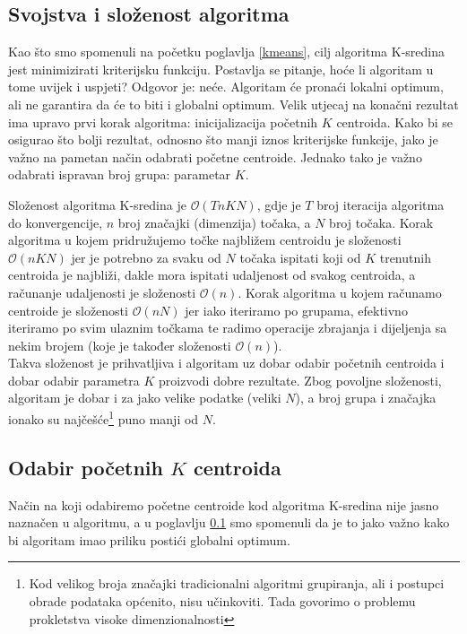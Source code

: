 \documentclass[times, utf8, zavrsni]{fer}
\begin{document}
\subsection{Svojstva i složenost algoritma}
\label{kmsvojstva}
Kao što smo spomenuli na početku poglavlja \ref{kmeans}, cilj algoritma K-sredina jest minimizirati kriterijsku funkciju. Postavlja se pitanje, hoće li algoritam u tome uvijek i uspjeti? Odgovor je: neće. Algoritam će pronaći lokalni optimum, ali ne garantira da će to biti i globalni optimum. Velik utjecaj na konačni rezultat ima upravo prvi korak algoritma: inicijalizacija početnih $K$ centroida. Kako bi se osigurao što bolji rezultat, odnosno što manji iznos kriterijske funkcije, jako je važno na pametan način odabrati početne centroide. Jednako tako je važno odabrati ispravan broj grupa: parametar $K$.

Složenost algoritma K-sredina je $\mathcal{O} \left(TnKN\right)$, gdje je $T$ broj iteracija algoritma do konvergencije, $n$ broj značajki (dimenzija) točaka, a $N$ broj točaka. Korak algoritma u kojem pridružujemo točke najbližem centroidu je složenosti $\mathcal{O} \left(nKN\right)$ jer je potrebno za svaku od $N$ točaka ispitati koji od $K$ trenutnih centroida je najbliži, dakle mora ispitati udaljenost od svakog centroida, a računanje udaljenosti je složenosti $\mathcal{O} \left(n\right)$. Korak algoritma u kojem računamo centroide je složenosti $\mathcal{O} \left(nN\right)$ jer iako iteriramo po grupama, efektivno iteriramo po svim ulaznim točkama te radimo operacije zbrajanja i dijeljenja sa nekim brojem (koje je također složenosti $\mathcal{O} \left(n\right)$).\\
Takva složenost je prihvatljiva i algoritam uz dobar odabir početnih centroida i dobar odabir parametra $K$ proizvodi dobre rezultate. Zbog povoljne složenosti, algoritam je dobar i za jako velike podatke (veliki $N$), a broj grupa i značajka ionako su najčešće\footnote{Kod velikog broja značajki tradicionalni algoritmi grupiranja, ali i postupci obrade podataka općenito, nisu učinkoviti. Tada govorimo o problemu prokletstva visoke dimenzionalnosti } puno manji od $N$.

\subsection{Odabir početnih $K$ centroida}
\label{kminitial}
Način na koji odabiremo početne centroide kod algoritma K-sredina nije jasno naznačen u algoritmu, a u poglavlju \ref{kmsvojstva} smo spomenuli da je to jako važno kako bi algoritam imao priliku postići globalni optimum.
\end{document}
